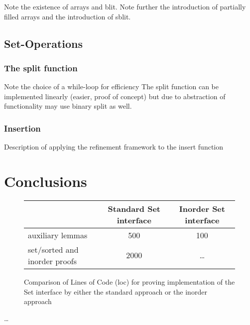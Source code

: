 Note the existence of arrays and blit.
Note further the introduction of partially filled arrays
and the introduction of sblit.

\section{Set-Operations}

\subsection{The split function}

Note the choice of a while-loop for efficiency
The split function can be implemented linearly (easier, proof of concept)
but due to abstraction of functionality may use binary split as well.

\subsection{Insertion}

Description of applying the refinement framework to the insert function

\chapter{Conclusions}

\begin{figure}
    \begin{tabular}{l|c|c}
        \                & Standard Set interface & Inorder Set interface \\
        \hline
        auxiliary lemmas & 500                    & 100                   \\
        set/sorted and inorder proofs & 2000      & \dots                 \\
    \end{tabular}
    \caption{Comparison of Lines of Code (loc) for proving implementation
    of the Set interface by either the standard approach or the inorder approach}
    \label{fig:proof-standard-inorder}
\end{figure}

\dots